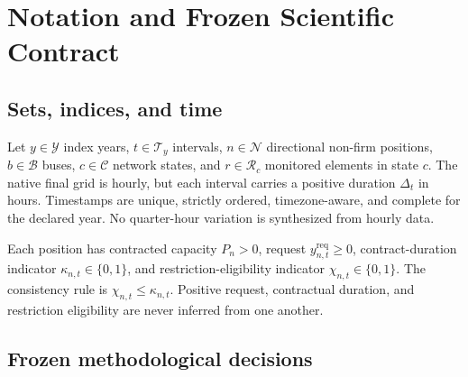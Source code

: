 \documentclass[10pt,journal,onecolumn]{IEEEtran}
\begin{document}
\section{Notation and Frozen Scientific Contract}
\label{sec:report_contract}

\subsection{Sets, indices, and time}

Let $y\in\mathcal Y$ index years, $t\in\mathcal T_y$ intervals,
$n\in\mathcal N$ directional non-firm positions, $b\in\mathcal B$ buses,
$c\in\mathcal C$ network states, and $r\in\mathcal R_c$ monitored elements in
state $c$. The native final grid is hourly, but each interval carries a
positive duration $\Delta_t$ in hours. Timestamps are unique, strictly
ordered, timezone-aware, and complete for the declared year. No quarter-hour
variation is synthesized from hourly data.

Each position has contracted capacity $P_n>0$, request
$y^{\mathrm{req}}_{n,t}\geq0$, contract-duration indicator
$\kappa_{n,t}\in\{0,1\}$, and restriction-eligibility indicator
$\chi_{n,t}\in\{0,1\}$. The consistency rule is
$\chi_{n,t}\leq\kappa_{n,t}$. Positive request, contractual duration, and
restriction eligibility are never inferred from one another.

\subsection{Frozen methodological decisions}
\end{document}
